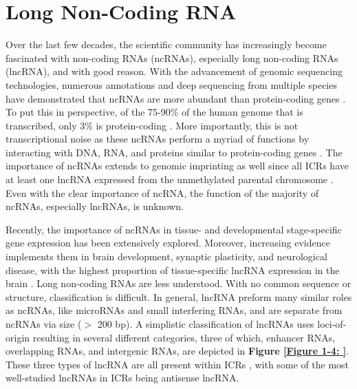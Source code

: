 {\section{Long Non-Coding RNA}

Over the last few decades, the scientific community has increasingly become fascinated with non-coding RNAs (ncRNAs), especially long non-coding RNAs (lncRNA), and with good reason. With the advancement of genomic sequencing technologies, numerous annotations and deep sequencing from multiple species have demonstrated that ncRNAs are more abundant than protein-coding genes \cite{Clark2011,Kapranov2007a}. To put this in perspective, of the 75-90\% of the human genome that is transcribed, only 3\% is protein-coding \cite{Carninci2005,Consortium2012,Djebali2012,Guttman2009,Kapranov2007}. More importantly, this is not transcriptional noise as these ncRNAs perform a myriad of functions by interacting with DNA, RNA, and proteins similar to protein-coding genes \cite{Mattick2005,Mercer2009}. The importance of ncRNAs extends to genomic imprinting as well since all ICRs have at least one lncRNA expressed from the unmethylated parental chromosome \cite{Lee2013,Mohammad2009,Sleutels2002}. Even with the clear importance of ncRNA, the function of the majority of ncRNAs, especially lncRNAs, is unknown.

Recently, the importance of ncRNAs in tissue- and developmental stage-specific gene expression has been extensively explored. Moreover, increasing evidence implements them in brain development, synaptic plasticity, and neurological disease, with the highest proportion of tissue-specific lncRNA expression in the brain \cite{Derrien2012,Washietl2014}. Long non-coding RNAs are less understood. With no common sequence or structure, classification is difficult. In general, lncRNA preform many similar roles as ncRNAs, like microRNAs and small interfering RNAs, and are separate from ncRNAs via size ($>$ 200 bp). A simplistic classification of lncRNAs uses loci-of-origin resulting in several different categories, three of which, enhancer RNAs, overlapping RNAs, and intergenic RNAs, are depicted in \textbf{Figure \ref{Figure 1-4: }}. These three types of lncRNA are all present within ICRs \cite{Bartolomei1991,Darrow2013,Katayama2005,Wevrick1997,Wevrick1994}, with some of the most well-studied lncRNAs in ICRs being antisense lncRNA.

}
